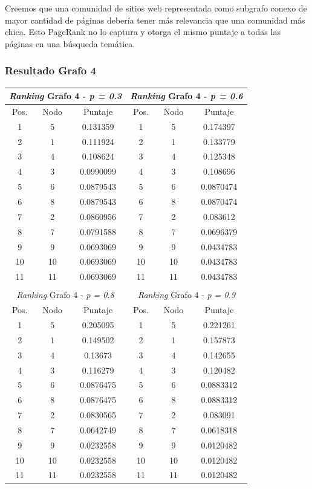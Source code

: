 Creemos que una comunidad de sitios web representada como subgrafo conexo de mayor cantidad de páginas debería tener más relevancia que una comunidad más chica. Esto PageRank no lo captura y otorga el mismo puntaje a todas las páginas en una búsqueda temática. \\
            
\subsubsection{Resultado Grafo 4} 

\begin{center}
         \begin{tabular}{|c|c|c||c|c|c|}
                    \hline
                    \multicolumn{3}{|c||}{\emph{Ranking} Grafo 4 - \emph{p = 0.3}} & \multicolumn{3}{c|}{\emph{Ranking} Grafo 4 - \emph{p = 0.6}} \\ \hline
                    Pos. & Nodo & Puntaje    & Pos. & Nodo & Puntaje  \\ \hline
1 & 5 & 0.131359 & 1 & 5 & 0.174397 \\ 
2 & 1 & 0.111924 & 2 & 1 & 0.133779 \\
3 & 4 & 0.108624  & 3 & 4 & 0.125348 \\
4 & 3 & 0.0990099  & 4 & 3 & 0.108696 \\
5 &  6 & 0.0879543 & 5 & 6 & 0.0870474 \\
6 & 8 & 0.0879543  & 6 & 8 & 0.0870474 \\
7 & 2 & 0.0860956  & 7 & 2 & 0.083612 \\
8 &  7 & 0.0791588 & 8 & 7 & 0.0696379 \\
9 &  9 & 0.0693069 & 9 & 9 & 0.0434783 \\
10 & 10 & 0.0693069  & 10 & 10 & 0.0434783\\
11 & 11 & 0.0693069  & 11 & 11 & 0.0434783 \\ \hline
                    \multicolumn{6}{c}{} \\ \hline
                    \multicolumn{3}{|c||}{\emph{Ranking} Grafo 4 - \emph{p = 0.8}} & \multicolumn{3}{c|}{\emph{Ranking} Grafo 4 - \emph{p = 0.9}} \\ \hline
                    Pos. & Nodo & Puntaje    & Pos. & Nodo & Puntaje  \\ \hline
1 & 5 & 0.205095 & 1 & 5 & 0.221261 \\ 
2 & 1 & 0.149502 & 2 & 1 & 0.157873 \\
3 & 4 & 0.13673  & 3 & 4 & 0.142655 \\
4 & 3 & 0.116279  & 4 & 3 & 0.120482 \\
5 &  6 & 0.0876475 & 5 & 6 & 0.0883312 \\
6 & 8 & 0.0876475 & 6 & 8 & 0.0883312 \\
7 & 2 & 0.0830565  & 7 & 2 & 0.083091 \\
8 &  7 & 0.0642749 & 8 & 7 & 0.0618318 \\
9 &  9 & 0.0232558& 9 & 9 & 0.0120482 \\
10 & 10 & 0.0232558  & 10 & 10 & 0.0120482\\
11 & 11 & 0.0232558  & 11 & 11 & 0.0120482 \\ \hline


\end{tabular}
\end{center}
